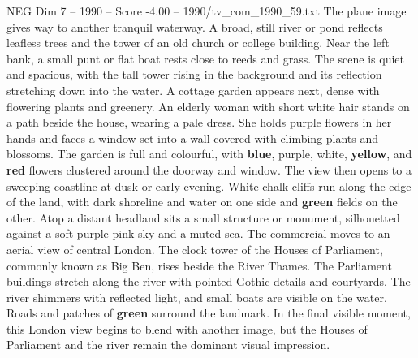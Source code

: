 \begin{textsample}{NEG Dim 7 – 1990 – Score -4.00 – 1990/tv\_com\_1990\_59.txt}
The plane image gives way to another tranquil waterway.
A broad, still river or pond reflects leafless trees and the tower of an old church or college building.
Near the left bank, a small punt or flat boat rests close to reeds and grass.
The scene is quiet and spacious, with the tall tower rising in the background and its reflection stretching down into the water.
A cottage garden appears next, dense with flowering plants and greenery.
An elderly woman with short white hair stands on a path beside the house, wearing a pale dress.
She holds purple flowers in her hands and faces a window set into a wall covered with climbing plants and blossoms.
The garden is full and colourful, with \textbf{blue}, purple, white, \textbf{yellow}, and \textbf{red} flowers clustered around the doorway and window.
The view then opens to a sweeping coastline at dusk or early evening.
White chalk cliffs run along the edge of the land, with dark shoreline and water on one side and \textbf{green} fields on the other.
Atop a distant headland sits a small structure or monument, silhouetted against a soft purple-pink sky and a muted sea.
The commercial moves to an aerial view of central London.
The clock tower of the Houses of Parliament, commonly known as Big Ben, rises beside the River Thames.
The Parliament buildings stretch along the river with pointed Gothic details and courtyards.
The river shimmers with reflected light, and small boats are visible on the water.
Roads and patches of \textbf{green} surround the landmark.
In the final visible moment, this London view begins to blend with another image, but the Houses of Parliament and the river remain the dominant visual impression.

\end{textsample}
